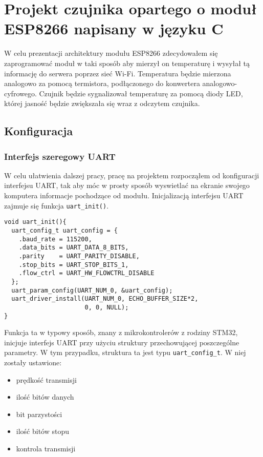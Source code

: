 \chapter{Projekt czujnika opartego o moduł ESP8266 napisany w języku C}
\label{projekt}

W celu prezentacji architektury modułu ESP8266 zdecydowałem się zaprogramować 
moduł w taki sposób aby mierzył on temperaturę i wysyłał tą informację do serwera
poprzez sieć Wi-Fi. Temperatura będzie mierzona analogowo za pomocą termistora, 
podłączonego do konwertera analogowo-cyfrowego. Czujnik będzie sygnalizował 
temperaturę za pomocą diody LED, której jasność będzie zwiększała się wraz z 
odczytem czujnika.

\section{Konfiguracja}
\label{projekt_konfiguracja}

\subsection{Interfejs szeregowy UART}
\label{projekt_uart}
W celu ułatwienia dalszej pracy, pracę na projektem rozpocząłem od konfiguracji
interfejsu UART, tak aby móc w prosty sposób wyswietlać na ekranie swojego komputera
informacje pochodzące od modułu. Inicjalizacją interfejsu UART zajmuje się funkcja
\verb+uart_init()+. \\

\begin{lstlisting}[style=customc,
    frame=single,
    caption={Konfiguracja interfejsu UART},
    captionpos=b,
    label={esptool_basic}]
void uart_init(){
  uart_config_t uart_config = {
    .baud_rate = 115200,
    .data_bits = UART_DATA_8_BITS,
    .parity    = UART_PARITY_DISABLE,
    .stop_bits = UART_STOP_BITS_1,
    .flow_ctrl = UART_HW_FLOWCTRL_DISABLE
  };
  uart_param_config(UART_NUM_0, &uart_config);
  uart_driver_install(UART_NUM_0, ECHO_BUFFER_SIZE*2, 
                      0, 0, NULL);
}
\end{lstlisting}

Funkcja ta w typowy sposób, znany z mikrokontrolerów z rodziny STM32, inicjuje interfejs UART
przy użyciu struktury przechowującej poszczególne parametry. W tym przypadku, struktura ta 
jest typu \verb+uart_config_t+. W niej zostały ustawione:\\
\begin{itemize}
    \item prędkość transmisji 
    \item ilość bitów danych
    \item bit parzystości
    \item ilość bitów stopu
    \item kontrola transmisji\\
\end{itemize} 

